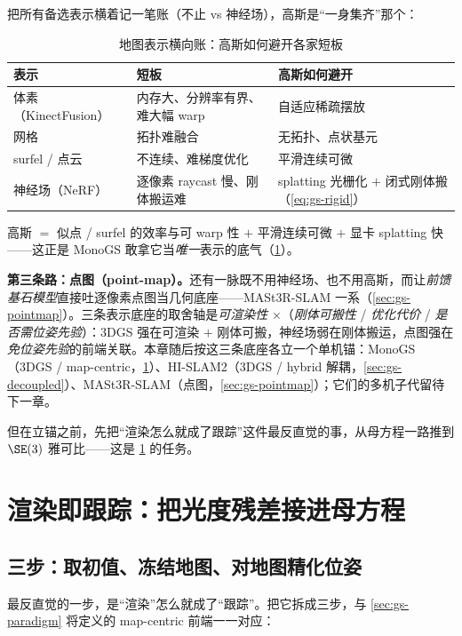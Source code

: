 把所有备选表示横着记一笔账（不止 vs 神经场），高斯是“一身集齐”那个：

\begin{table}[H]\centering
\caption{地图表示横向账：高斯如何避开各家短板}
\label{tab:gs-repr}
\small
\begin{tabular}{@{}lll@{}}
\toprule
表示 & 短板 & 高斯如何避开 \\
\midrule
体素（KinectFusion）& 内存大、分辨率有界、难大幅 warp & 自适应稀疏摆放 \\
网格 & 拓扑难融合 & 无拓扑、点状基元 \\
surfel / 点云 & 不连续、难梯度优化 & 平滑连续可微 \\
神经场（NeRF）& 逐像素 raycast 慢、刚体搬运难 & splatting 光栅化 $+$ 闭式刚体搬（\cref{eq:gs-rigid}）\\
\bottomrule
\end{tabular}
\end{table}

\noindent{}高斯 $=$ 似点 / surfel 的效率与可 warp 性 $+$ 平滑连续可微 $+$ 显卡 splatting 快——这正是 MonoGS \cite{matsuki2024monogs} 敢拿它当\emph{唯一}表示的底气（\cref{sec:gs-track}）。

\textbf{第三条路：点图（point-map）。}还有一脉既不用神经场、也不用高斯，而让\emph{前馈基石模型}直接吐逐像素点图当几何底座——MASt3R-SLAM \cite{leroy2024mast3r} 一系（\cref{sec:gs-pointmap}）。三条表示底座的取舍轴是\emph{可渲染性} $\times$（\emph{刚体可搬性} / \emph{优化代价} / \emph{是否需位姿先验}）：3DGS 强在可渲染 $+$ 刚体可搬，神经场弱在刚体搬运，点图强在\emph{免位姿先验}的前端关联。本章随后按这三条底座各立一个单机锚：MonoGS（3DGS / map-centric，\cref{sec:gs-track}）、HI-SLAM2（3DGS / hybrid 解耦，\cref{sec:gs-decoupled}）、MASt3R-SLAM（点图，\cref{sec:gs-pointmap}）；它们的多机子代留待下一章。

但在立锚之前，先把“渲染怎么就成了跟踪”这件最反直觉的事，从母方程一路推到 $\SE(3)$ 雅可比——这是 \cref{sec:gs-track} 的任务。

\section{渲染即跟踪：把光度残差接进母方程}
\label{sec:gs-track}

\subsection{三步：取初值、冻结地图、对地图精化位姿}

最反直觉的一步，是“渲染”怎么就成了“跟踪”。把它拆成三步，与 \cref{sec:gs-paradigm} 将定义的 map-centric 前端一一对应：

